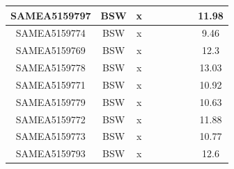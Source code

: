 \documentclass[../main.tex]{subfiles}
\begin{document}
\begin{flushleft}
\begin{footnotesize}
\begin{longtable}{|c|c|c|c|c|c|c|}
    \hline
    SAMEA5159797  & BSW   & x                                                            & ~          & ~                                                                           & ~                                                                 & 11.98     \\ 
    \hline
    SAMEA5159774  & BSW   & x                                                            & ~          & ~                                                                           & ~                                                                 & 9.46      \\ 
    \hline
    SAMEA5159769  & BSW   & x                                                            & ~          & ~                                                                           & ~                                                                 & 12.3      \\ 
    \hline
    SAMEA5159778  & BSW   & x                                                            & ~          & ~                                                                           & ~                                                                 & 13.03     \\ 
    \hline
    SAMEA5159771  & BSW   & x                                                            & ~          & ~                                                                           & ~                                                                 & 10.92     \\ 
    \hline
    SAMEA5159779  & BSW   & x                                                            & ~          & ~                                                                           & ~                                                                 & 10.63     \\ 
    \hline
    SAMEA5159772  & BSW   & x                                                            & ~          & ~                                                                           & ~                                                                 & 11.88     \\ 
    \hline
    SAMEA5159773  & BSW   & x                                                            & ~          & ~                                                                           & ~                                                                 & 10.77     \\ 
    \hline
    SAMEA5159793  & BSW   & x                                                            & ~          & ~                                                                           & ~                                                                 & 12.6      \\ 

\end{longtable}
\end{footnotesize}
\end{flushleft}
\end{document}
